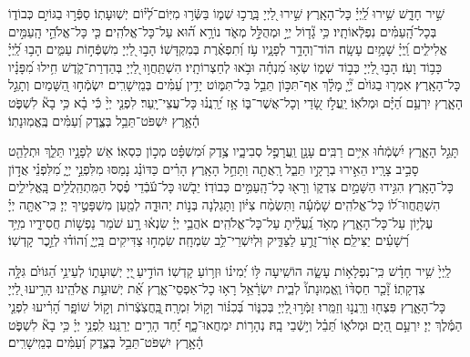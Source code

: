 \documentclass[twoside, openany, parskip=half, 11pt]{book}
\begin{document}
 שִׁ֣יר חָדָ֑שׁ שִׁ֥ירוּ לַֽ֝יְיָ֗ כָּל־הָאָֽרֶץ׃ 
 שִׁ֣ירוּ לַ֭יְיָ בָּֽרֲכ֣וּ שְׁמ֑וֹ בַּשְּֿׂר֥וּ מִיּֽוֹם־לְ֝י֗וֹם יְשֽׁוּעָתֽוֹ׃ 
 סַפְּֿר֣וּ בַגּוֹיִ֣ם כְּבוֹד֑וֹ בְּכָל־הָֽ֝עַמִּ֗ים נִפְלְֿאוֹתָֽיו׃ 
 כִּ֥י גָ֘ד֤וֹל יְיָ֣ וּמְהֻלָּ֣ל מְאֹ֑ד נוֹרָ֥א ה֝֗וּא עַל־כָּל־אֱלֹהִֽים׃ 
 כִּ֤י כָּל־אֱלֹהֵ֣י הָֽעַמִּ֣ים אֱלִילִ֑ים וַֽ֝יְיָ֗ שָׁמַ֥יִם עָשָֽׂה׃ 
 הוֹד־וְהָדָ֥ר לְפָנָ֑יו עֹ֥ז וְ֝תִפְאֶ֗רֶת בְּמִקְדָּשֽׁוֹ׃ 
 הָב֣וּ לַ֭יְיָ מִשְׁפְּֿח֣וֹת עַמִּ֑ים הָב֥וּ לַֽ֝יְיָ֗ כָּב֥וֹד וָעֹֽז׃ 
 הָב֣וּ לַ֭יְיָ כְּב֣וֹד שְׁמ֑וֹ שְׂא֥וּ מִ֝נְחָ֗ה וּבֹ֥אוּ לְחַצְרוֹתָֽיו׃ 
 הִשְׁתַּֽחֲו֣וּ לַ֭יְיָ בְּהַדְרַת־קֹ֑דֶשׁ חִ֥ילוּ מִ֝פָּנָ֗יו כָּל־הָאָֽרֶץ׃ 
 אִמְר֤וּ בַגּוֹיִ֨ם יְ֘יָ֤ מָלָ֗ךְ אַף־תִּכּ֣וֹן תֵּבֵ֣ל בַּל־תִּמּ֑וֹט יָדִ֥ין עַ֝מִּ֗ים בְּמֵֽישָׁרִֽים׃ 
 יִשְׂמְֿח֣וּ הַ֭שָּׁמַיִם וְתָגֵ֣ל הָאָ֑רֶץ יִרְעַ֥ם הַ֝יָּ֗ם וּמְלֹאֽוֹ׃ 
 יַֽעֲלֹ֣ז שָׂ֭דַי וְכָל־אֲשֶׁר־בּ֑וֹ אָ֥ז יְ֝רַֽנֲנ֗וּ כָּל־עֲצֵי־יָֽעַר׃ 
 לִפְנֵ֤י יְיָ֨ כִּ֬י בָ֗א כִּ֥י בָא֘ לִשְׁפֹּ֢ט הָ֫אָ֥רֶץ יִשְׁפֹּט־תֵּבֵ֥ל בְּצֶ֑דֶק וְ֝עַמִּ֗ים בֶּֽאֱמֽוּנָתֽוֹ׃

 תָּגֵ֣ל הָאָ֑רֶץ יִ֝שְׂמְֿח֗וּ אִיִּ֥ים רַבִּֽים׃ 
 עָנָ֣ן וַֽעֲרָפֶ֣ל סְבִיבָ֑יו צֶ֥דֶק וּ֝מִשְׁפָּ֗ט מְכ֣וֹן כִּסְאֽוֹ׃ 
 אֵשׁ לְפָנָ֣יו תֵּלֵ֑ךְ וּתְלַהֵ֖ט סָבִ֣יב צָרָֽיו׃ 
 הֵאִ֣ירוּ בְרָקָ֣יו תֵּבֵ֑ל רָֽאֲתָ֖ה וַתָּחֵ֣ל הָאָֽרֶץ׃ 
 הָרִ֗ים כַּדּוֹנַ֗ג נָמַסּוּ מִלִּפְנֵ֣י יְיָ֑ מִ֝לִּפְנֵ֗י אֲד֣וֹן כָּל־הָאָֽרֶץ׃ 
 הִגִּ֣ידוּ הַשָּׁמַ֣יִם צִדְק֑וֹ וְרָא֖וּ כָל־הָֽעַמִּ֣ים כְּבוֹדֽוֹ׃ 
 יֵבֹ֤שׁוּ כָּל־עֹ֬בְֿדֵי פֶ֗סֶל הַמִּֽתְהַֽלֲלִ֥ים בָּֽאֱלִילִ֑ים הִשְׁתַּֽחֲווּ־ל֝וֹ כָּל־אֱלֹהִֽים׃ 
 שָׁמְֿעָ֬ה וַתִּשְׂמַ֨ח צִיּ֗וֹן וַתָּגֵלְנָה בְּנ֣וֹת יְהוּדָ֑ה לְמַ֖עַן מִשְׁפָּטֶ֣יךָ יְיָ׃ 
 כִּֽי־אַתָּ֤ה יְיָ֗ עֶלְי֥וֹן עַל־כָּל־הָאָ֑רֶץ מְאֹ֥ד נַֽ֝עֲלֵ֗יתָ עַל־כָּל־אֱלֹהִֽים׃ 
 אֹהֲבֵ֥י יְיָ֗ שִׂנְא֫וּ רָ֥ע שֹׁמֵר נַפְשׁ֣וֹת חֲסִידָ֑יו מִיַּ֥ד רְ֝שָׁעִ֗ים יַצִּילֵֽם׃ 
 א֖וֹר־זָרֻ֣עַ לַצַּדִּ֑יק וּֽלְיִשְׁרֵי־לֵ֥ב שִׂמְחָֽה׃ 
שִׂמְח֣וּ צַדִּיקִים בַּֽיְיָ֑ וְ֝הוֹד֗וּ לְזֵ֣כֶר קָדְשֽׁוֹ׃


 לַֽיְיָ֙ שִׁ֥יר חָדָ֗שׁ כִּֽי־נִפְלָא֥וֹת עָשָׂ֑ה הוֹשִֽׁיעָה לּ֥וֹ יְ֝מִינ֗וֹ וּזְר֥וֹעַ קָדְשֽׁוֹ׃ 
 הוֹדִ֣יעַ ֖יְיָ יְשֽׁוּעָת֑וֹ לְעֵינֵ֥י הַ֝גּוֹיִ֗ם גִּלָּ֥ה צִדְקָתֽוֹ׃ 
 זָ֘כַ֤ר חַסְדּ֨וֹ וֶֽאֱמֽוּנָתוֹ֘ לְבֵ֢ית יִשְׂרָ֫אֵ֥ל רָא֥וּ כָל־אַפְסֵי־אָ֑רֶץ אֵ֝֗ת יְשׁוּעַ֥ת אֱלֹהֵֽינוּ׃
 הָרִ֣יעוּ לַ֭יְיָ כָּל־הָאָ֑רֶץ פִּצְח֖וּ וְרַֽנֲנ֣וּ וְזַמֵּֽרוּ׃ 
 זַמְּֿר֣וּ ֖לַיְיָ בְּכִנּ֑וֹר בְּ֝כִנּ֗וֹר וְק֣וֹל זִמְרָֽה׃ 
 ֖בַּֽחֲצֹֽצְֿרוֹת וְק֣וֹל שׁוֹפָ֑ר הָ֝רִ֗יעוּ לִפְנֵ֤י הַמֶּ֬לֶךְ יְיָ׃ 
 יִרְעַ֣ם הַ֭יָּם וּמְלֹא֑וֹ תֵּ֝בֵ֗ל וְי֣שְֿׁבֵי בָֽהּ׃ 
 נְהָר֥וֹת יִמְחֲאוּ־כָ֑ף יַ֝֗חַד הָרִ֥ים יְרַנֵּֽנוּ׃ 
 לִֽפְנֵ֥י יְיָ֗ כִּ֥י בָא֘ לִשְׁפֹּ֢ט הָ֫אָ֥רֶץ יִשְׁפֹּט־תֵּבֵ֥ל בְּצֶ֑דֶק וְ֝עַמִּ֗ים בְּמֵֽישָׁרִֽים׃
 
\end{document}
